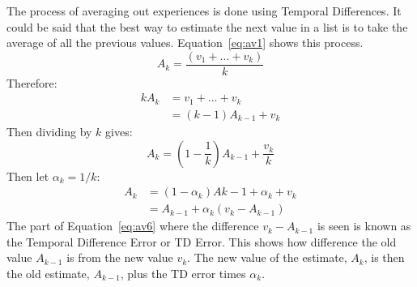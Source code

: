 The process of averaging out experiences is done using Temporal Differences. It could be said that the best way to estimate the next value in a list is to take the average of all the previous values. Equation~\ref{eq:av1} shows this process.
\begin{equation}\label{eq:av1}
A_{k} = \frac{(v_{1}+\dots+v_{k})}{k}
\end{equation}
Therefore:
\begin{align}
kA_{k} &= v_{1}+\dots+v_{k}\label{eq:av2}\\
 &= (k-1)A_{k-1}+v_{k}\label{eq:av3}
\end{align}
Then dividing by $k$ gives:
\begin{equation}\label{eq:av4}
A_{k}=(1-\frac{1}{k})A_{k-1}+\frac{v_{k}}{k}
\end{equation}
Then let $\alpha _{k}=1/k$:
\begin{align}
A_{k} &= (1-\alpha _{k})A{k-1}+\alpha _{k} + v_{k}\label{eq:av5}\\
&= A_{k-1} + \alpha _{k}(v_{k}-A_{k-1})\label{eq:av6}
\end{align}
The part of Equation~\ref{eq:av6} where the difference $v_{k}-A_{k-1}$ is seen is known as the Temporal Difference Error or TD Error. This shows how difference the old value $A_{k-1}$ is from the new value $v_{k}$. The new value of the estimate, $A_{k}$, is then the old estimate, $A_{k-1}$, plus the TD error times $\alpha _{k}$.

